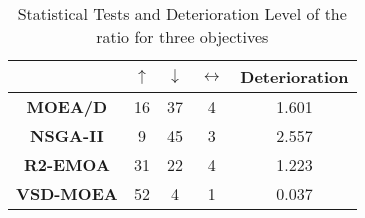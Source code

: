 \begin{table}[t]
\caption{Statistical Tests and Deterioration Level of the \HV{} ratio for three objectives}
\label{tab:Tests_HV_3obj}
\centering
\begin{scriptsize}
\begin{tabular}{c c|c|c|c}
\cline{2-5}
                                        & \textbf{$\uparrow$} & \textbf{$\downarrow$} & \textbf{$\leftrightarrow$} & \textbf{Deterioration} \\ \hline
\multicolumn{1}{c|}{\textbf{MOEA/D}}   & 16                  & 37                    & 4                          & 1.601         \\ \hline
\multicolumn{1}{c|}{\textbf{NSGA-II}}  & 9                   & 45                    & 3                          & 2.557         \\ \hline
\multicolumn{1}{c|}{\textbf{R2-EMOA}}  & 31                  & 22                    & 4                          & 1.223         \\ \hline
\multicolumn{1}{c|}{\textbf{VSD-MOEA}} & 52                  & 4                     & 1                          & 0.037         \\ \hline
\end{tabular}%
\end{scriptsize}
\end{table}

%
